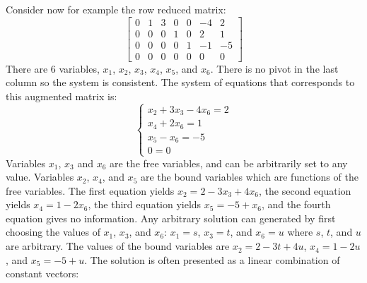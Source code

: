 \documentclass{article}
\begin{document}
\vspace{1mm}

Consider now for example the row reduced matrix:
\[\left[\begin{array}{cccccc|c}
0 & 1 & 3 & 0 & 0 & -4 & 2 \\
0 & 0 & 0 & 1 & 0 & 2 & 1 \\
0 & 0 & 0 & 0 & 1 & -1 & -5 \\
0 & 0 & 0 & 0 & 0 & 0 & 0
\end{array}\right]\]
There are \(6\) variables, \(x_1\), \(x_2\), \(x_3\), \(x_4\), \(x_5\), and \(x_6\). There is no pivot in the last column so the system is consistent. The system of equations that corresponds to this augmented matrix is:
\[\left\{\begin{array}{c}
x_2 + 3x_3 - 4x_6 = 2 \\
x_4 + 2x_6 = 1 \\
x_5 - x_6 = -5 \\
0 = 0
\end{array}\right.\] 
Variables \(x_1\), \(x_3\) and \(x_6\) are the free variables, and can be arbitrarily set to any value. Variables \(x_2\), \(x_4\), and \(x_5\) are the bound variables which are functions of the free variables. 
The first equation yields \(x_2 = 2 - 3x_3 + 4x_6\), the second equation yields \(x_4 = 1 - 2x_6\), the third equation yields \(x_5 = -5 + x_6\), and the fourth equation gives no information. Any arbitrary solution can generated by first choosing the values of \(x_1\), \(x_3\), and \(x_6\): \(x_1 = s\), \(x_3 = t\), and \(x_6 = u\) where \(s\), \(t\), and \(u\) are arbitrary. The values of the bound variables are \(x_2 = 2 - 3t + 4u\), \(x_4 = 1 - 2u\), and \(x_5 = -5 + u\). The solution is often presented as a linear combination of constant vectors:
\end{document}
